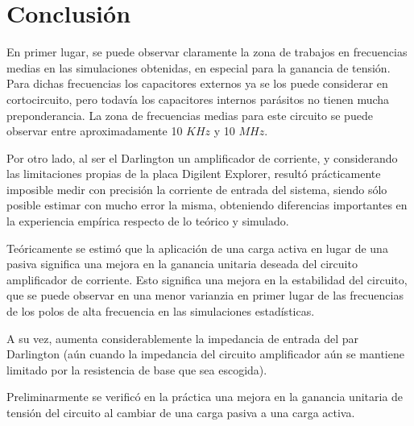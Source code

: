 \chapter{Conclusión}
En primer lugar, se puede observar claramente la zona de trabajos en frecuencias medias en las simulaciones obtenidas, en especial para la 
ganancia de tensión. Para dichas frecuencias los capacitores externos ya se los puede considerar en cortocircuito, pero todavía los capacitores 
internos parásitos no tienen mucha preponderancia. La zona de frecuencias medias para este circuito se puede observar entre aproximadamente 
10 $KHz$ y 10 $MHz$.

Por otro lado, al ser el Darlington un amplificador de corriente, y considerando las limitaciones propias de la placa Digilent Explorer,
 resultó prácticamente imposible medir con precisión la corriente de entrada del  sistema, siendo sólo posible estimar con mucho error la misma,
  obteniendo diferencias importantes en la experiencia empírica respecto de
 lo teórico y simulado.


Teóricamente se estimó que la aplicación de una carga activa en lugar de una pasiva significa una mejora en la ganancia unitaria deseada del circuito amplificador de corriente. Esto significa una mejora en la estabilidad del circuito, que se puede observar en una menor varianzia en primer lugar de las frecuencias de los polos de alta frecuencia en las simulaciones estadísticas.

A su vez, aumenta considerablemente la impedancia de entrada del par Darlington (aún cuando la impedancia del circuito amplificador aún se mantiene limitado por la resistencia de base que sea escogida).

Preliminarmente se verificó en la práctica una mejora en la ganancia unitaria de tensión del circuito al cambiar de una carga pasiva a una carga activa.